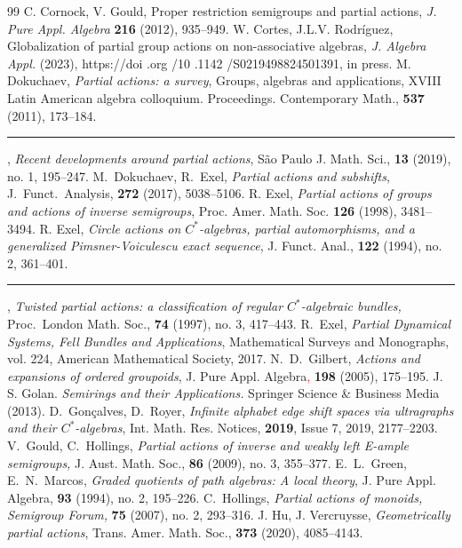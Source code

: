 \documentclass[10pt,a4paper]{amsart}
\theoremstyle{definition}
\theoremstyle{remark}
\numberwithin{equation}{section}
\newtheorem*{Theorem A}{\textbf{Theorem A}}
\newtheorem*{Corollary E}{\textbf{Corollary E}}
\newtheorem*{Corollary F}{\textbf{Corollary F}}
\newtheorem*{Theorem B}{\textbf{Theorem B}}
\newtheorem*{Theorem C}{\textbf{Theorem C}}
\newtheorem*{Theorem D}{\textbf{Theorem B}}
\newtheorem*{p a}{\textbf{Proof of  Theorem A}}
\newtheorem*{p b}{\textbf{Proof of Theorem B}}
\newtheorem*{p c}{\textbf{Proof of  Theorem C}}
\newtheorem*{p d}{\textbf{Proof of  Theorem D}}
\newcommand{\0}{{\vartheta}}
\begin{document}
\begin{thebibliography}{99}
 C. Cornock, V. Gould, Proper restriction semigroups and partial actions, {\it J. Pure Appl. Algebra} {\bf 216} (2012), 935--949.
 W. Cortes, J.L.V. Rodríguez, Globalization of partial group actions on non-associative algebras, {\em J. Algebra Appl.} (2023), https://doi .org /10 .1142 /S0219498824501391, in press.
 M. Dokuchaev, {\em Partial actions: a survey}, Groups, algebras and applications, XVIII Latin American algebra colloquium. Proceedings. Contemporary Math., {\bf 537} (2011), 173--184.
 \rule{11mm}{0.1mm}, {\em Recent developments around partial actions}, São Paulo J. Math. Sci., {\bf 13} (2019), no. 1, 195--247.
 M.\ Dokuchaev, R.\ Exel, {\em Partial actions and subshifts}, J.~Funct.~Analysis, {\bf 272} (2017), 5038--5106.
 R. Exel, {\em Partial actions of groups and actions of inverse semigroups}, Proc. Amer. Math. Soc. {\bf 126} (1998), 3481--3494.
 R. Exel, {\em Circle actions on $C^*$-algebras, partial automorphisms, and a generalized Pimsner-Voiculescu exact sequence}, J. Funct. Anal., {\bf 122} (1994), no. 2, 361--401.
 \rule{11mm}{0.1mm}, {\em Twisted partial actions: a classification of regular $C^*$-algebraic bundles,} Proc.\ London Math. Soc., {\bf 74} (1997), no. 3, 417--443.
 R.\ Exel, {\it Partial Dynamical Systems, Fell Bundles and Applications}, Mathematical Surveys and Monographs, vol. 224, American Mathematical Society, 2017.
 N.\ D.\ Gilbert, {\em Actions and expansions of ordered groupoids}, J. Pure Appl. Algebra\textcolor{red}{,} {\bf 198} (2005), 175--195.
 J. S. Golan. {\em Semirings and their Applications.} Springer Science \& Business Media (2013).
 D.\ Gon\c calves, D.\ Royer, {\em Infinite alphabet edge shift spaces via ultragraphs and their $C^*$-algebras}, Int. Math. Res. Notices, {\bf 2019}, Issue 7, 2019, 2177--2203.
 V.\ Gould, C.\ Hollings, {\em Partial actions of inverse and weakly left E-ample semigroups,} J. Aust. Math. Soc., {\bf 86} (2009), no. 3, 355--377.
 E.\ L.\ Green, E.\ N.\ Marcos, {\em Graded quotients of path algebras: A local theory}, J. Pure Appl. Algebra, {\bf 93} (1994), no. 2, 195--226.
 C.\ Hollings, {\em Partial actions of monoids,} {\it Semigroup Forum,} {\bf 75} (2007), no. 2, 293--316.
 J. Hu, J. Vercruysse, {\em Geometrically partial actions}, Trans. Amer. Math. Soc., {\bf 373} (2020), 4085--4143.

\end{thebibliography}
\end{document}

